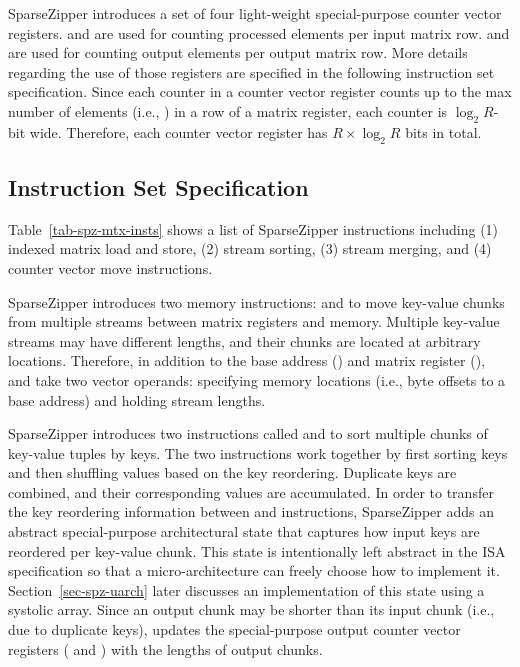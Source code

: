 SparseZipper introduces a set of four light-weight special-purpose counter
vector registers.
 and  are used for counting processed elements per input matrix
row.
 and  are used for counting output elements per output matrix
row.
More details regarding the use of those registers are specified in the
following instruction set specification.
Since each counter in a counter vector register counts up to the max number of
elements (i.e., ) in a row of a matrix register, each counter is
$\log_2R$-bit wide.  Therefore, each counter vector register has $R \times
\log_2 R$ bits in total.

\subsection{Instruction Set Specification}

%

Table~\ref{tab-spz-mtx-insts} shows a list of SparseZipper instructions
including (1) indexed matrix load and store, (2) stream sorting, (3) stream
merging, and (4) counter vector move instructions.

SparseZipper introduces two memory instructions:  and  to
move key-value chunks from multiple streams between matrix registers and
memory.
Multiple key-value streams may have different lengths, and their chunks are
located at arbitrary locations.
Therefore, in addition to the base address () and matrix register
(),  and  take two vector operands: 
specifying memory locations (i.e., byte offsets to a base address) and 
holding stream lengths.

%
%
%
%
%
%

SparseZipper introduces two instructions called  and
 to sort multiple chunks of key-value tuples by keys.
The two instructions work together by first sorting keys and then shuffling
values based on the key reordering.
Duplicate keys are combined, and their corresponding values are accumulated.
In order to transfer the key reordering information between  and
 instructions, SparseZipper adds an abstract special-purpose
architectural state that captures how input keys are reordered per key-value
chunk.
This state is intentionally left abstract in the ISA specification so that a
micro-architecture can freely choose how to implement it.
Section~\ref{sec-spz-uarch} later discusses an implementation of this state
using a systolic array.
Since an output chunk may be shorter than its input chunk (i.e., due to
duplicate keys),  updates the special-purpose output counter
vector registers ( and ) with the lengths of output chunks.


